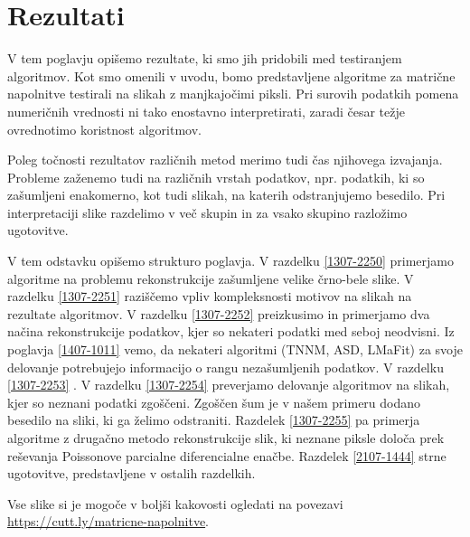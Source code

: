 \chapter{Rezultati}\label{1407-1012}

V tem poglavju opišemo rezultate, ki smo jih pridobili med testiranjem algoritmov. Kot smo omenili v uvodu, bomo predstavljene algoritme za matrične napolnitve testirali na slikah z manjkajočimi piksli. 
Pri surovih podatkih pomena numeričnih vrednosti ni tako enostavno interpretirati, zaradi česar težje ovrednotimo koristnost algoritmov.

Poleg točnosti rezultatov različnih metod merimo tudi čas njihovega izvajanja. Probleme zaženemo tudi na različnih vrstah podatkov, npr. podatkih, ki so zašumljeni enakomerno, kot tudi slikah, na katerih odstranjujemo besedilo.
Pri interpretaciji slike razdelimo v več skupin in za vsako skupino razložimo ugotovitve.

V tem odstavku opišemo strukturo poglavja.
V razdelku \ref{1307-2250} primerjamo algoritme na problemu rekonstrukcije zašumljene velike črno-bele slike. V razdelku \ref{1307-2251} raziščemo vpliv kompleksnosti motivov na slikah na rezultate algoritmov. V razdelku \ref{1307-2252} preizkusimo in primerjamo dva načina rekonstrukcije podatkov, kjer so nekateri podatki med seboj neodvisni. Iz poglavja \ref{1407-1011} vemo, da nekateri algoritmi (TNNM, ASD, LMaFit) za svoje delovanje potrebujejo informacijo o rangu nezašumljenih podatkov. V razdelku \ref{1307-2253} . V razdelku \ref{1307-2254} preverjamo delovanje algoritmov na slikah, kjer so neznani podatki zgoščeni.
Zgoščen šum je v našem primeru dodano besedilo na sliki, ki ga želimo odstraniti. Razdelek \ref{1307-2255} pa primerja algoritme z drugačno metodo rekonstrukcije slik, ki neznane piksle določa prek reševanja Poissonove parcialne diferencialne enačbe. Razdelek \ref{2107-1444} strne ugotovitve, predstavljene v ostalih razdelkih.


Vse slike si je mogoče v boljši kakovosti ogledati na povezavi \url{https://cutt.ly/matricne-napolnitve}.

